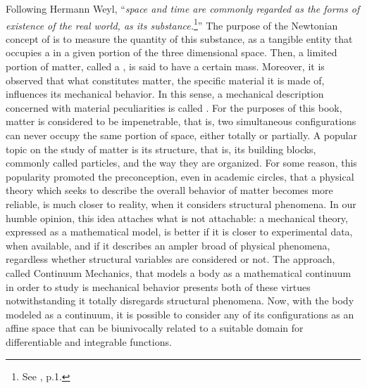 Following Hermann Weyl, ``\emph{space and time are commonly regarded as the forms of existence of the real world,  as its substance.}\footnote{See \cite{weyl_1952_2}, p.1.}'' The purpose of the Newtonian concept of  is to measure the quantity of this substance, as a tangible entity that occupies a  in a given portion of the three dimensional space. Then, a limited portion of matter, called a , is said to have a certain mass. Moreover, it is observed that what constitutes matter, the specific material it is made of, influences its mechanical behavior. In this sense, a mechanical description concerned with material peculiarities is called . For the purposes of this book, matter is considered to be impenetrable, that is, two simultaneous configurations can never occupy the same portion of space, either totally or partially. A popular topic on the study of matter is its structure, that is, its building blocks, commonly called particles, and the way they are organized. For some reason, this popularity promoted the preconception, even in academic circles, that a physical theory which seeks to describe the overall behavior of matter becomes more reliable, is much closer to reality, when it considers structural phenomena. In our humble opinion, this idea attaches what is not attachable: a mechanical theory, expressed as a mathematical model, is better if it is closer to experimental data, when available, and if it describes an ampler broad of physical phenomena, regardless whether structural variables are considered or not. The approach, called Continuum Mechanics, that models a body as a mathematical continuum in order to study is mechanical behavior presents both of these virtues notwithstanding it totally disregards structural phenomena. Now, with the body modeled as a continuum, it is possible to consider any of its configurations as an affine space that can be biunivocally related to a suitable domain for differentiable and integrable functions.




